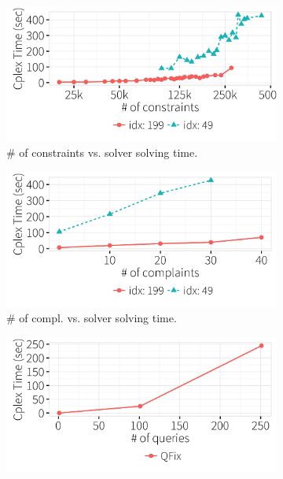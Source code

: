   \begin{figure}[t]
  \centering
      \begin{subfigure} [t]{.3\textwidth}
    \includegraphics[width = .99\columnwidth]{figures/num_cons_time}
    \vspace*{-.25in}
    \caption{\# of constraints vs. solver solving time.}
    \vspace*{-.1in}
    \label{f:heuristic_time} 
    \end{subfigure}
    \begin{subfigure} [t]{.3\textwidth}
    \includegraphics[width = .99\columnwidth]{figures/num_compl_time}
    \vspace*{-.25in}
    \caption{\# of compl. vs. solver solving time.}
    \vspace*{-.1in}
    \label{f:heuristic_acc} 
    \end{subfigure}
    \begin{subfigure} [t]{.3\textwidth}
    \includegraphics[width = .99\columnwidth]{figures/num_queries_time}

\end{subfigure}
\end{figure}
